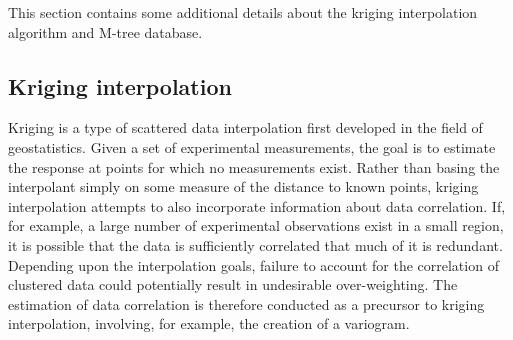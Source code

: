 \documentclass[12pt]{article}
\begin{document}
This section contains some additional details about the kriging
interpolation algorithm and M-tree database.

\subsection{Kriging interpolation}

Kriging is a type of scattered data interpolation first developed in
the field of geostatistics.  Given a set of experimental measurements,
the goal is to estimate the response at points for which no
measurements exist.  Rather than basing the interpolant simply on
some measure of the distance to known points, kriging
interpolation attempts to also incorporate information about data
correlation.  If, for example, a large number of experimental
observations exist in a small region, it is possible that the data is
sufficiently correlated that much of it is redundant.  Depending upon
the interpolation goals, failure to account for the
correlation of clustered data could potentially result in undesirable
over-weighting.  The estimation of data correlation is therefore conducted as a
precursor to kriging interpolation, involving, for example, the creation of a variogram.
\end{document}
